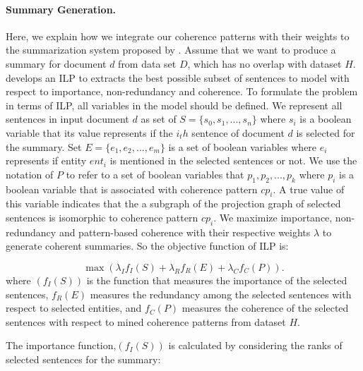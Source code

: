 \paragraph{Summary Generation.}
Here, we explain how we integrate our coherence patterns with their weights to the summarization system proposed by .
Assume that we want to produce a summary for document $d$ from data set $D$, which has no overlap with dataset $H$. 
 develops an ILP to extracts the best possible subset of sentences to model with respect to importance, non-redundancy and coherence. 
To formulate the problem in terms of ILP, all variables in the model should be defined. 
We represent all sentences in input document $d$ as set of $S = \lbrace s_0,s_1,...,s_n \rbrace$ where $s_i$ is a boolean variable that its value represents if the $i_th$ sentence of document $d$ is selected for the summary. 
Set $E=\lbrace e_1, e_2,...,e_m \rbrace$ is a set of boolean variables where $e_i$ represents if entity $ent_i$ is mentioned in the selected sentences or not. 
We use the notation of $P$ to refer to a set of boolean variables that $p_1,p_2,..., p_k$ where $p_i$ is a boolean variable that is associated with coherence pattern $cp_i$. A true value of this variable indicates that the a subgraph of the projection graph of selected sentences is isomorphic to coherence pattern $cp_i$.   
We maximize importance, non-redundancy and pattern-based coherence with their respective weights $\lambda$ to generate coherent summaries. 
So the objective function of ILP is:

\begin{equation}
\max(\lambda_I f_I(S) + \lambda_R f_R(E) + \lambda_C f_C(P )).
\end{equation}
where $(f_I(S))$ is the function that measures the importance of the selected sentences, $f_R(E)$ measures the redundancy among the selected sentences with respect to selected entities, and $f_C(P)$ measures the coherence of the selected sentences with respect to mined coherence patterns from dataset $H$. 

The importance function,$(f_I(S))$ is calculated by considering the ranks of selected sentences for the summary:

